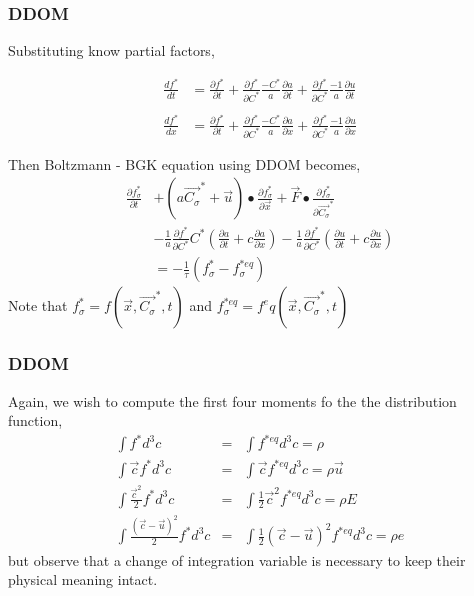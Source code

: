 \documentclass[11pt,fleqn]{beamer}
\begin{document}
\begin{frame}
	\frametitle{DDOM}
	Substituting know partial factors,
			
	\begin{align*}
		\frac{df^*}{dt} &= \frac{\partial{f^*}}{\partial{t}} + 
				\frac{\partial{f^*}}{\partial{C^*}} \frac{-C^*}{a} \frac{\partial{a}}{\partial{t}} + 
				\frac{\partial{f^*}}{\partial{C^*}} \frac{ -1 }{a} \frac{\partial{u}}{\partial{t}}
		\\		
		\\ \frac{df^*}{dx} &= \frac{\partial{f^*}}{\partial{t}} + 
				\frac{\partial{f^*}}{\partial{C^*}} \frac{-C^*}{a} \frac{\partial{a}}{\partial{x}} + 
				\frac{\partial{f^*}}{\partial{C^*}} \frac{ -1 }{a} \frac{\partial{u}}{\partial{x}}
	\end{align*}
\end{frame}

\begin{frame}
Then Boltzmann - BGK equation using DDOM becomes,
	\begin{equation}
		\begin{split}
			\frac{\partial{f^*_\sigma}}{\partial{t}} &+ (a\vec{C_\sigma}^{*}+\vec{u})\bullet\frac{\partial{f^*_\sigma}}{\partial{\vec{x}}} 
			+\vec{F}\bullet\frac{\partial{f^*_\sigma}}{\partial{\vec{C_\sigma}^{*}}}
			\\ &-\frac{1}{a}\frac{\partial f^*}{\partial C^*}C^*\left(\frac{\partial a}{\partial t} +c \frac{\partial a}{\partial x} \right )
			-\frac{1}{a}\frac{\partial f^*}{\partial C^*}\left(\frac{\partial u}{\partial t} +c \frac{\partial u}{\partial x} \right ) 
			\\ &= -\frac{1}{\tau}(f^*_\sigma-f^{*eq}_\sigma)
		\end{split}
	\end{equation}
	Note that $f^*_\sigma = f(\vec{x},\vec{C_\sigma}^{*},t)$ and $f^{*eq}_\sigma=f^eq(\vec{x},\vec{C_\sigma}^{*},t)$
\end{frame}

\begin{frame}
	\frametitle{DDOM}
	Again, we wish to compute the first four moments fo the the distribution function,
	\begin{eqnarray}
	\int f^* d^3 c  &=& \int f^{*eq}d^3c = \rho \\
	\int \vec{c} f^* d^3 c  &=& \int \vec{c} f^{*eq}d^3c = \rho \vec{u} \nonumber \\
	\int \frac{\vec{c}^2}{2} f^* d^3 c  &=& \int \frac{1}{2}\vec{c}^2 f^{*eq}d^3c = \rho E \nonumber \\
	\int \frac{(\vec{c}-\vec{u})^2}{2} f^* d^3 c  &=& \int \frac{1}{2}(\vec{c}-\vec{u})^2 f^{*eq}d^3c = \rho e \nonumber
	\end{eqnarray}
	but observe that a change of integration variable is necessary to keep their physical meaning intact.
\end{frame}
\end{document}

